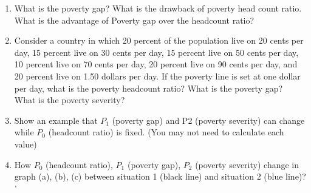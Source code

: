 \begin{homeworkProblem}

    \begin{enumerate}
        \item What is the poverty gap? What is the drawback of poverty head 
        count ratio. What is the advantage of Poverty gap over the headcount 
        ratio?
        \item Consider a country in which 20 percent of the population live on 
        20 cents per day, 15 percent live on 30 cents per day, 15 percent live 
        on 50 cents per day, 10 percent live on 70 cents per day, 20 percent 
        live on 90 cents per day, and 20 percent live on 1.50 dollars per day. 
        If the poverty line is set at one dollar per day, what is the poverty 
        headcount ratio? What is the poverty gap? What is the poverty severity?
        \item Show an example that $P_1$ (poverty gap) and P2 (poverty 
        severity) can change while $P_0$ (headcount ratio) is fixed. (You may 
        not need to calculate each value)
        \item How $P_0$ (headcount ratio), $P_1$ (poverty gap), $P_2$ (poverty 
        severity) change in graph (a), (b), (c) between situation 1 (black 
        line) and situation 2 (blue line)?
'    \end{enumerate}

\end{homeworkProblem}